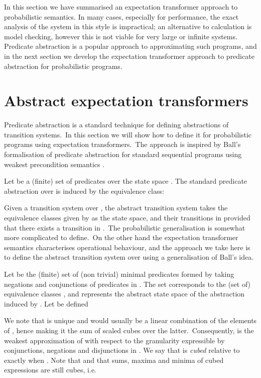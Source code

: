 \documentclass[numbers,copyright,creativecommons]{eptcs}
\newcommand{\IE}{\textrm{i.e.}}
\begin{document}
In this section we have summarised an expectation transformer approach to probabilistic semantics. In many cases, especially for performance, the exact analysis of the system in this style is impractical; an alternative to calculation is model checking, however this is not viable for very large or infinite systems. Predicate abstraction is a popular approach to approximating such programs, and in the next section we develop the expectation transformer approach to predicate abstraction for probabilistic programs.


\section{Abstract expectation transformers}\label{AET}

Predicate abstraction is a standard technique for defining abstractions of transition systems.\ In this section we will show how to define it for probabilistic programs using expectation transformers.\ The approach is inspired by Ball's formalisation of predicate abstraction for standard sequential programs  using weakest precondition semantics \cite{Ball}.

Let  be a (finite) set of predicates over the state space . The standard predicate abstraction over  is induced by the equivalence class:

Given a transition system  over , the abstract transition system  takes the equivalence classes given by  as the state space, and their transitions  in  provided that there exists a transition  in .\ The probabilistic generalisation is somewhat more complicated to define.\ On the other hand the expectation transformer semantics characterises operational behaviour, and the approach we take here is to define the abstract transition system over  using a generalisation of Ball's idea.

Let  be the (finite) set of (non trivial) minimal predicates formed by taking negations and conjunctions of predicates in . The set  corresponds to the (set of) equivalence classes , and represents the abstract state space of the abstraction induced by .
Let  be defined


We note that  is unique and would usually be a linear combination of the elements of , hence making it the sum of scaled cubes over the latter.\ Consequently,  is the weakest approximation of  with respect to the granularity expressible by conjunctions, negations and disjunctions in .
We say that  is \emph{cubed} relative to  exactly when . Note that  and
that  sums, maxima and minima of cubed expressions are still cubes, \IE\
\end{document}
